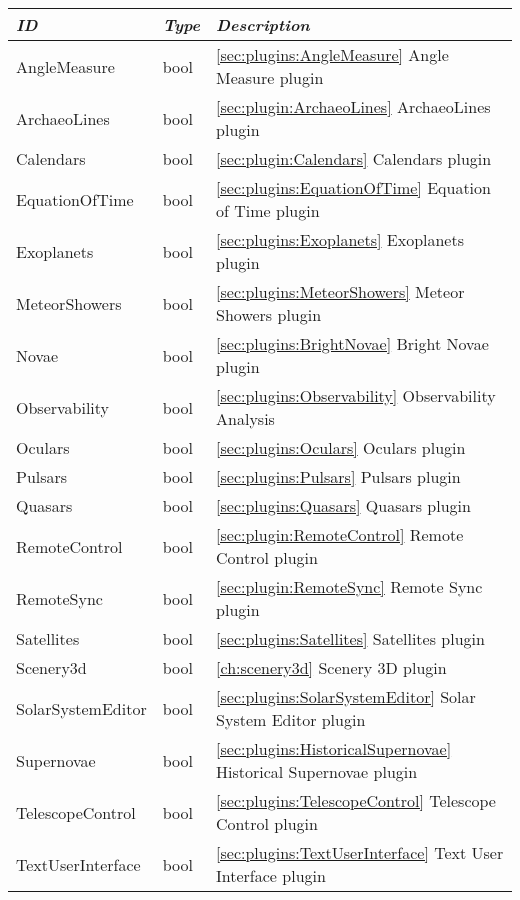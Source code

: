 \begin{longtable}{l|l|p{80mm}}
\toprule
\emph{ID} & \emph{Type} & \emph{Description}\\\midrule
AngleMeasure          & bool & \ref{sec:plugins:AngleMeasure} Angle Measure plugin\\
ArchaeoLines          & bool & \ref{sec:plugin:ArchaeoLines} ArchaeoLines plugin\\
Calendars             & bool & \ref{sec:plugin:Calendars} Calendars plugin\\
EquationOfTime        & bool & \ref{sec:plugins:EquationOfTime} Equation of Time plugin\\
Exoplanets            & bool & \ref{sec:plugins:Exoplanets} Exoplanets plugin \\
MeteorShowers         & bool & \ref{sec:plugins:MeteorShowers} Meteor Showers plugin \\
Novae                 & bool & \ref{sec:plugins:BrightNovae} Bright Novae plugin \\
Observability         & bool & \ref{sec:plugins:Observability} Observability Analysis\\
Oculars               & bool & \ref{sec:plugins:Oculars} Oculars plugin \\
Pulsars               & bool & \ref{sec:plugins:Pulsars} Pulsars plugin \\
Quasars               & bool & \ref{sec:plugins:Quasars} Quasars plugin \\
RemoteControl         & bool & \ref{sec:plugin:RemoteControl} Remote Control plugin \\
RemoteSync            & bool & \ref{sec:plugin:RemoteSync} Remote Sync plugin \\
Satellites            & bool & \ref{sec:plugins:Satellites} Satellites plugin \\
Scenery3d             & bool & \ref{ch:scenery3d} Scenery 3D plugin \\
SolarSystemEditor     & bool & \ref{sec:plugins:SolarSystemEditor} Solar System Editor plugin\\
Supernovae            & bool & \ref{sec:plugins:HistoricalSupernovae} Historical Supernovae plugin \\
TelescopeControl      & bool & \ref{sec:plugins:TelescopeControl} Telescope Control plugin \\
TextUserInterface     & bool & \ref{sec:plugins:TextUserInterface} Text User Interface plugin \\\bottomrule
\end{longtable}

